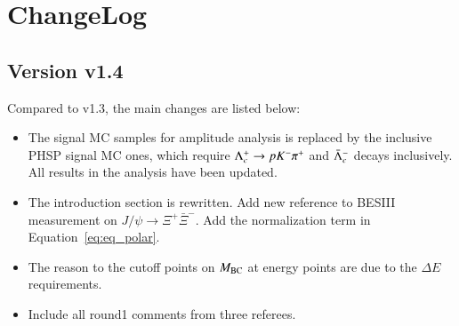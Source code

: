 \section*{ChangeLog}

\subsection*{Version v1.4}
Compared to v1.3, the main changes are listed below:
\begin{itemize}
\item The signal MC samples for amplitude analysis is replaced by the inclusive PHSP signal MC ones, which require $\Lambda_{c}^{+} \rightarrow pK^-\pi^+$ and $\bar{\Lambda}_{c}^{-}$ decays inclusively. All results in the analysis have been updated.
\item The introduction section is rewritten. Add new reference to BESIII measurement on $J/\psi \to \Xi^+\bar{\Xi}^-$. Add the normalization term in Equation~\ref{eq:eq_polar}.
\item The reason to the cutoff points on $M_{\rm{BC}}$ at energy points are due to the $\Delta E$ requirements. 
\item Include all round1 comments from three referees.
\end{itemize}
